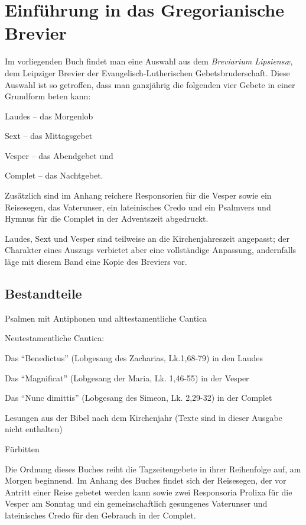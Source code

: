 \chapter[Einführung]{Einführung in das Gregorianische Brevier}
\def\gebet{\textsc{Einführung}}
Im vorliegenden Buch findet man eine Auswahl aus dem \textit{Breviarium
Lipsiensæ}, dem Leipziger Brevier der Evangelisch-Lutherischen
Gebetsbruderschaft. Diese Auswahl ist so getroffen, dass man ganzjährig die
folgenden vier Gebete in einer Grundform beten kann:\par
\begin{asparaenum}
\item Laudes -- das Morgenlob
\item Sext -- das Mittagsgebet
\item Vesper -- das Abendgebet und
\item Complet -- das Nachtgebet.
\end{asparaenum}
Zusätzlich sind im Anhang reichere Responsorien für die Vesper sowie ein
Reisesegen, das Vaterunser, ein lateinisches Credo und ein Psalmvers und Hymnus
für die Complet in der Adventszeit abgedruckt.\par
Laudes, Sext und Vesper sind teilweise an die Kirchenjahreszeit angepasst; der
Charakter eines Auszugs verbietet aber eine vollständige Anpassung, andernfalls
läge mit diesem Band eine Kopie des Breviers vor.
\section*{Bestandteile}
\begin{asparaenum}
\item Psalmen mit Antiphonen und alttestamentliche Cantica
\item Neutestamentliche Cantica:
\begin{asparaitem}[$\triangleright$]
 \item Das \enquote{Benedictus} (Lobgesang des Zacharias, Lk.1,68-79) in den
Laudes
\item Das \enquote{Magnificat} (Lobgesang der Maria, Lk. 1,46-55) in der Vesper
\item Das \enquote{Nunc dimittis} (Lobgesang des Simeon, Lk. 2,29-32) in der
Complet
\end{asparaitem}
\item Lesungen aus der Bibel nach dem Kirchenjahr (Texte sind in dieser Ausgabe
nicht enthalten)
\item Fürbitten
\end{asparaenum}
Die Ordnung dieses Buches reiht die Tagzeitengebete in ihrer Reihenfolge auf, am
Morgen beginnend. Im Anhang des Buches findet sich der Reisesegen, der vor
Antritt einer Reise gebetet werden kann sowie zwei Responsoria Prolixa für die
Vesper am Sonntag und ein gemeinschaftlich gesungenes Vaterunser und
lateinisches Credo für den Gebrauch in der Complet.
